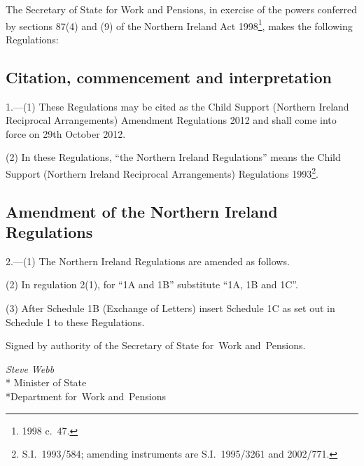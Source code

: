 \documentclass[12pt,a4paper]{article}
\title{\regstitle}
\author{S.I.\ 2012 No.\ 2380}
\date{Made
17th September 2012\\
Laid before the House of Commons
17th September 2012\\
Coming into force
29th October 2012
}
\begin{document}
\maketitle

\noindent
The Secretary of State for Work and Pensions, in exercise of the powers conferred by sections 87(4) and (9) of the Northern Ireland Act 1998\footnote{1998 c.~47.}, makes the following Regulations: 

{\sloppy

\tableofcontents

}

\bigskip

\setcounter{secnumdepth}{-2}

\subsection[1. Citation, commencement and interpretation]{Citation, commencement and interpretation}

1.---(1)  These Regulations may be cited as the Child Support (Northern Ireland Reciprocal Arrangements) Amendment Regulations 2012 and shall come into force on 29th October 2012.

(2) In these Regulations, “the Northern Ireland Regulations” means the Child Support (Northern Ireland Reciprocal Arrangements) Regulations 1993\footnote{S.I.~1993/584; amending instruments are S.I.~1995/3261 and 2002/771.}.

\subsection[2. Amendment of the Northern Ireland Regulations]{Amendment of the Northern Ireland Regulations}

2.---(1)  The Northern Ireland Regulations are amended as follows.

(2) In regulation 2(1), for “1A and 1B” substitute “1A, 1B and 1C”.

(3) After Schedule 1B (Exchange of Letters) insert Schedule 1C as set out in Schedule 1 to these Regulations. 

\bigskip

\pagebreak[3]

Signed 
by authority of the 
Secretary of State for~Work and~Pensions.

{\raggedleft
\emph{Steve Webb}\\*
Minister
of State\\*Department 
for~Work and~Pensions

}
\end{document}
